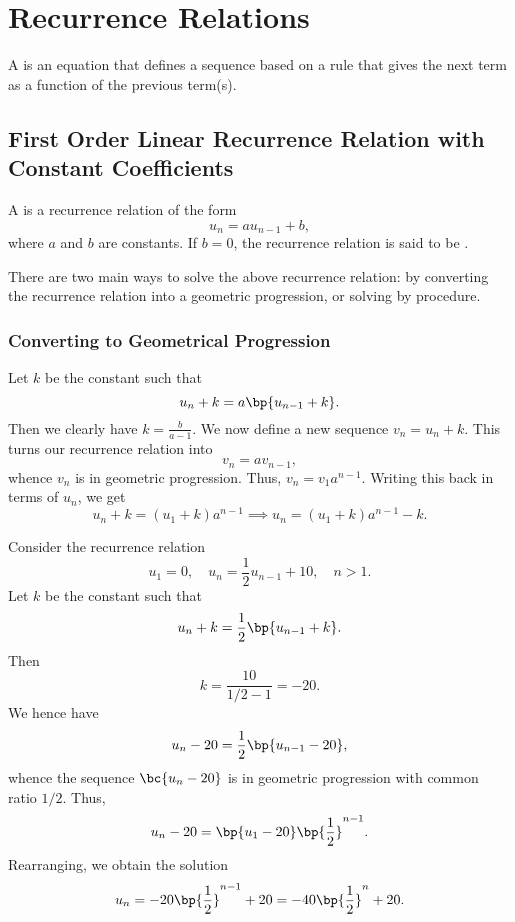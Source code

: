 \chapter{Recurrence Relations}

\begin{definition}
    A  is an equation that defines a sequence based on a rule that gives the next term as a function of the previous term(s).
\end{definition}

\section{First Order Linear Recurrence Relation with Constant Coefficients}

\begin{definition}
    A  is a recurrence relation of the form \[u_n = a u_{n-1} + b,\] where $a$ and $b$ are constants. If $b = 0$, the recurrence relation is said to be .
\end{definition}

There are two main ways to solve the above recurrence relation: by converting the recurrence relation into a geometric progression, or solving by procedure.

\subsection{Converting to Geometrical Progression}

\begin{recipe}
    Let $k$ be the constant such that \[u_n + k = a\bp{u_{n-1} + k}.\] Then we clearly have $k = \frac{b}{a - 1}$. We now define a new sequence $v_n = u_n + k$. This turns our recurrence relation into \[v_n = av_{n-1},\] whence $v_n$ is in geometric progression. Thus, $v_n = v_1 a^{n-1}$. Writing this back in terms of $u_n$, we get \[u_n + k = (u_1 + k) a^{n-1} \implies u_n = (u_1 + k)a^{n-1} - k.\]
\end{recipe}

\begin{example}[Solving by GP]
    Consider the recurrence relation \[u_1 = 0, \quad u_n = \frac12 u_{n-1} + 10, \quad n > 1.\] Let $k$ be the constant such that \[u_n + k = \frac12 \bp{u_{n-1} + k}.\] Then \[k = \frac{10}{1/2 - 1} = -20.\] We hence have \[u_n - 20 = \frac12 \bp{u_{n-1} - 20},\] whence the sequence $\bc{u_n - 20}$ is in geometric progression with common ratio $1/2$. Thus, \[u_n - 20 = \bp{u_1 - 20} \bp{\frac12}^{n-1}.\] Rearranging, we obtain the solution \[u_n = -20 \bp{\frac12}^{n-1} + 20 = -40 \bp{\frac12}^n + 20.\]
\end{example}

